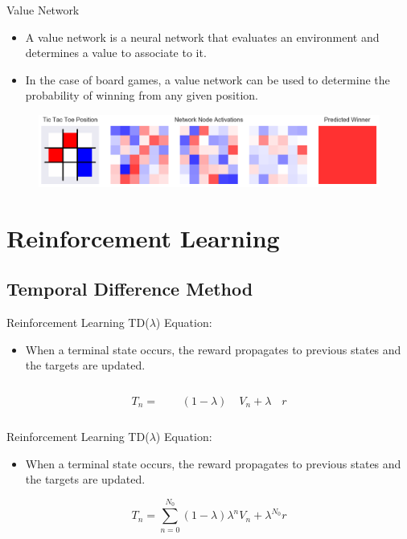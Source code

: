 \begin{frame}{Value Network}
\begin{itemize}
\item A value network is a neural network that evaluates an environment and determines a value to associate to it.
\item In the case of board games, a value network can be used to determine the probability of winning from any given position.
\end{itemize}
\begin{figure}
\includegraphics[width=1. \textwidth]{network_weights}
\end{figure}
\end{frame}

\section{Reinforcement Learning}
\subsection{Temporal Difference Method}
\begin{frame}{Reinforcement Learning}
TD($\lambda$) Equation: 
\begin{itemize}
\item[] When a terminal state occurs, the reward propagates to previous states and the targets are updated.
\end{itemize}
\begin{equation*}
T_n = \phantom{\sum_{n=0}^{N_0} }(1-\lambda)\phantom{\lambda^n} V_n + \lambda^{\phantom{N_0}} r
\end{equation*}
\end{frame}

\begin{frame}{Reinforcement Learning}
TD($\lambda$) Equation: 
\begin{itemize}
\item[] When a terminal state occurs, the reward propagates to previous states and the targets are updated.
\end{itemize}
\begin{equation*}
T_n = \sum_{n=0}^{N_0} (1-\lambda)\lambda^n V_n + \lambda^{N_0} r
\end{equation*}
\end{frame}
